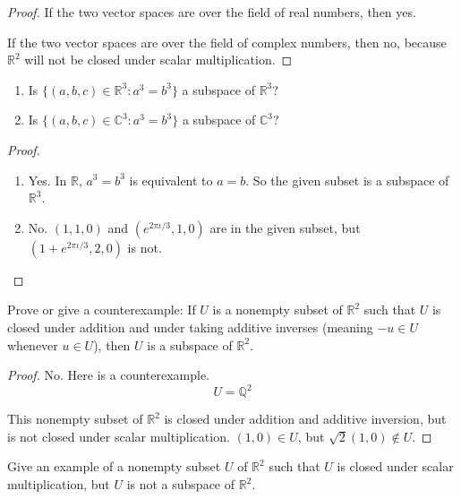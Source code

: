 \begin{proof}
    If the two vector spaces are over the field of real numbers, then yes.

    If the two vector spaces are over the field of complex numbers, then no, because $\mathbb{R}^{2}$ will not be closed under scalar multiplication.
\end{proof}

\begin{exercise}
    \begin{enumerate}[label={(\alph*)}]
        \item Is $\{ (a, b, c)\in\mathbb{R}^{3}: a^{3} = b^{3} \}$ a subspace of $\mathbb{R}^{3}$?
        \item Is $\{ (a, b, c)\in\mathbb{C}^{3}: a^{3} = b^{3} \}$ a subspace of $\mathbb{C}^{3}$?
    \end{enumerate}
\end{exercise}

\begin{proof}
    \begin{enumerate}[label={(\alph*)}]
        \item Yes. In $\mathbb{R}$, $a^{3} = b^{3}$ is equivalent to $a = b$. So the given subset is a subspace of $\mathbb{R}^{3}$.
        \item No. $(1, 1, 0)$ and $(e^{2\pi\iota/3}, 1, 0)$ are in the given subset, but $(1 + e^{2\pi\iota/3}, 2, 0)$ is not.
    \end{enumerate}
\end{proof}

\begin{exercise}
    Prove or give a counterexample: If $U$ is a nonempty subset of $\mathbb{R}^{2}$ such that $U$ is closed under addition and under taking additive inverses (meaning $-u\in U$ whenever $u\in U$), then $U$ is a subspace of $\mathbb{R}^{2}$.
\end{exercise}

\begin{proof}
    No. Here is a counterexample.
    \[
        U = \mathbb{Q}^{2}
    \]

    This nonempty subset of $\mathbb{R}^{2}$ is closed under addition and additive inversion, but is not closed under scalar multiplication. $(1, 0)\in U$, but $\sqrt{2}(1, 0)\notin U$.
\end{proof}

\begin{exercise}
    Give an example of a nonempty subset $U$ of $\mathbb{R}^{2}$ such that $U$ is closed under scalar multiplication, but $U$ is not a subspace of $\mathbb{R}^{2}$.
\end{exercise}

